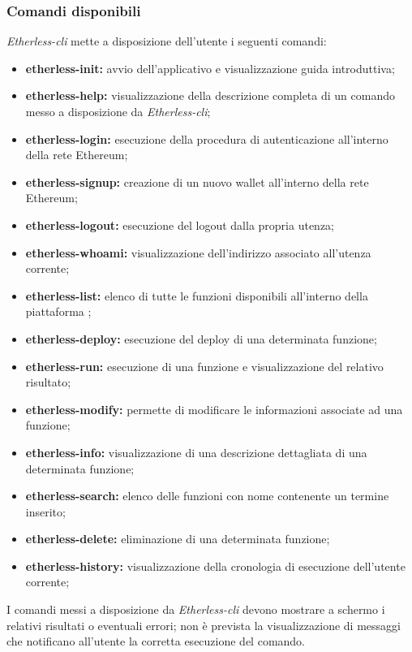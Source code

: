 \subsubsection{Comandi disponibili}
\textit{Etherless-cli} mette a disposizione dell'utente i seguenti comandi: 
\begin{itemize}
	\item \textbf{etherless-init:} avvio dell'applicativo e visualizzazione guida introduttiva; 
	\item \textbf{etherless-help:} visualizzazione della descrizione completa di un comando messo a disposizione da \textit{Etherless-cli}; 
	\item \textbf{etherless-login:} esecuzione della procedura di autenticazione all'interno della rete Ethereum; 
	\item \textbf{etherless-signup:} creazione di un nuovo wallet all'interno della rete Ethereum; 
	\item \textbf{etherless-logout:} esecuzione del logout dalla propria utenza; 
	\item \textbf{etherless-whoami:} visualizzazione dell'indirizzo associato all'utenza corrente; 
	\item \textbf{etherless-list:} elenco di tutte le funzioni disponibili all'interno della piattaforma \NomeProgetto{}; 
	\item \textbf{etherless-deploy:} esecuzione del deploy di una determinata funzione;  
	\item \textbf{etherless-run:} esecuzione di una funzione e visualizzazione del relativo risultato; 
	\item \textbf{etherless-modify:} permette di modificare le informazioni associate ad una funzione; 
	\item \textbf{etherless-info:} visualizzazione di una descrizione dettagliata di una determinata funzione; 
	\item \textbf{etherless-search:} elenco delle funzioni con nome contenente un termine inserito; 
	\item \textbf{etherless-delete:} eliminazione di una determinata funzione;
	\item \textbf{etherless-history:} visualizzazione della cronologia di esecuzione dell'utente corrente;  
\end{itemize}
I comandi messi a disposizione da \textit{Etherless-cli} devono mostrare a schermo i relativi risultati o eventuali errori; non è prevista la visualizzazione di messaggi che notificano all'utente la corretta esecuzione del comando. 

